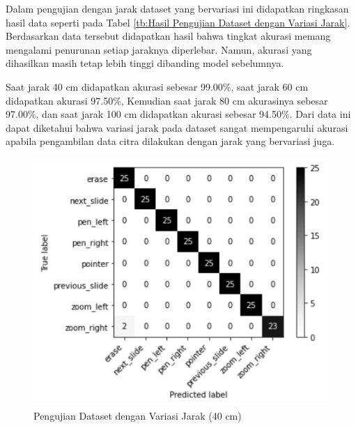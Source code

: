 Dalam pengujian dengan jarak dataset yang bervariasi ini didapatkan ringkasan hasil data seperti pada Tabel \ref{tb:Hasil Pengujian Dataset dengan Variasi Jarak}. Berdasarkan data tersebut didapatkan hasil bahwa tingkat akurasi memang mengalami penurunan setiap jaraknya diperlebar. Namun, akurasi yang dihasilkan masih tetap lebih tinggi dibanding model sebelumnya. 

Saat jarak 40 cm didapatkan akurasi sebesar 99.00\%, saat jarak 60 cm didapatkan akurasi 97.50\%, Kemudian saat jarak 80 cm akurasinya sebesar 97.00\%, dan saat jarak 100 cm didapatkan akurasi sebesar 94.50\%. Dari data ini dapat diketahui bahwa variasi jarak pada dataset sangat mempengaruhi akurasi apabila pengambilan data citra dilakukan dengan jarak yang bervariasi juga.

\begin{figure}[!htb]
  \centering
  \includegraphics[scale=0.78]{gambar/pengujian-jarak/heterogen-dataset/40cm.png}
  \caption{Pengujian Dataset dengan Variasi Jarak (40 cm)}
  \label{fig:Pengujian Dataset dengan Variasi Jarak (40 cm)}
\end{figure}

